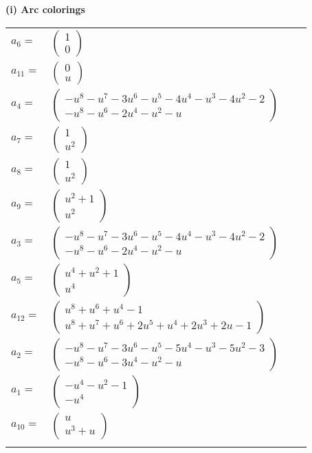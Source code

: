 \documentclass[1p]{elsarticle_modified}
\theoremstyle{definition}
\begin{document}
\flushleft \textbf{(i) Arc colorings}\\
\begin{tabular}{m{7pt} m{180pt} m{7pt} m{180pt} }
\flushright $a_{6}=$&$\begin{pmatrix}1\\0\end{pmatrix}$ \\
\flushright $a_{11}=$&$\begin{pmatrix}0\\u\end{pmatrix}$ \\
\flushright $a_{4}=$&$\begin{pmatrix}- u^8- u^7-3 u^6- u^5-4 u^4- u^3-4 u^2-2\\- u^8- u^6-2 u^4- u^2- u\end{pmatrix}$ \\
\flushright $a_{7}=$&$\begin{pmatrix}1\\u^2\end{pmatrix}$ \\
\flushright $a_{8}=$&$\begin{pmatrix}1\\u^2\end{pmatrix}$ \\
\flushright $a_{9}=$&$\begin{pmatrix}u^2+1\\u^2\end{pmatrix}$ \\
\flushright $a_{3}=$&$\begin{pmatrix}- u^8- u^7-3 u^6- u^5-4 u^4- u^3-4 u^2-2\\- u^8- u^6-2 u^4- u^2- u\end{pmatrix}$ \\
\flushright $a_{5}=$&$\begin{pmatrix}u^4+u^2+1\\u^4\end{pmatrix}$ \\
\flushright $a_{12}=$&$\begin{pmatrix}u^8+u^6+u^4-1\\u^8+u^7+u^6+2 u^5+u^4+2 u^3+2 u-1\end{pmatrix}$ \\
\flushright $a_{2}=$&$\begin{pmatrix}- u^8- u^7-3 u^6- u^5-5 u^4- u^3-5 u^2-3\\- u^8- u^6-3 u^4- u^2- u\end{pmatrix}$ \\
\flushright $a_{1}=$&$\begin{pmatrix}- u^4- u^2-1\\- u^4\end{pmatrix}$ \\
\flushright $a_{10}=$&$\begin{pmatrix}u\\u^3+u\end{pmatrix}$\\&\end{tabular}
\end{document}
